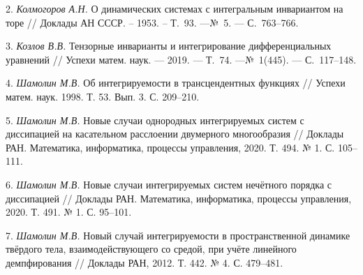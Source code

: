 2. {\it Колмогоров А.Н.} О динамических системах с интегральным инвариантом на торе
// Доклады АН СССР. -- 1953. -- Т.~93. ---№~5. --- С.~763--766.

3. {\it Козлов В.В.} Тензорные инварианты и интегрирование дифференциальных
уравнений // Успехи матем. наук. --- 2019. --- Т.~74. ---№~1(445). --- С.~117--148.

4. {\it Шамолин М.В.} Об интегрируемости в трансцендентных функциях // Успехи матем. наук. 1998. Т. 53. Вып. 3. С. 209–210.

5. {\it Шамолин М.В.} Новые случаи однородных интегрируемых систем с диссипацией на касательном расслоении двумерного многообразия // Доклады РАН. Математика, информатика, процессы управления, 2020. Т. 494. № 1. С. 105–111.

6. {\it Шамолин М.В.} Новые случаи интегрируемых систем нечётного порядка с диссипацией // Доклады РАН. Математика, информатика, процессы управления, 2020. Т. 491. № 1. С. 95–101.

7. {\it Шамолин М.В.} Новый случай интегрируемости в пространственной динамике твёрдого тела, взаимодействующего со средой, при учёте линейного демпфирования // Доклады РАН, 2012. Т. 442. № 4. С. 479–481.


